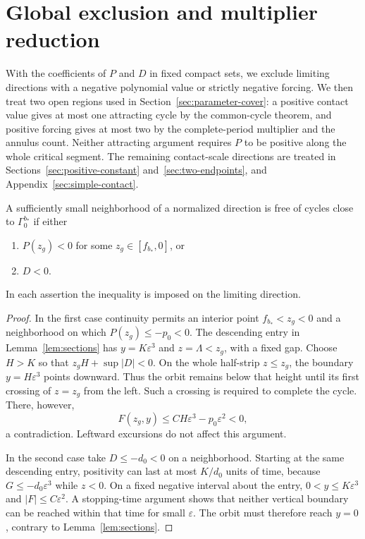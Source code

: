 \section{Global exclusion and multiplier reduction}\label{sec:whole-period}
With the coefficients of $P$ and $D$ in fixed compact sets, we exclude
limiting directions with a negative polynomial value or strictly negative
forcing. We then treat two open regions used in
Section~\ref{sec:parameter-cover}: a positive contact value gives at most
one attracting cycle by the common-cycle theorem, and positive forcing
gives at most two by the complete-period multiplier and the annulus
count. Neither attracting argument requires $P$ to be positive along
the whole critical segment. The remaining contact-scale directions are
treated in Sections~\ref{sec:positive-constant}
and~\ref{sec:two-endpoints}, and Appendix~\ref{sec:simple-contact}.

\begin{lemma}\label{lem:negative-gates}
A sufficiently small neighborhood of a normalized direction is free
of cycles close to $\Gamma_0^{b_*}$ if either
\begin{enumerate}
\item $P(z_g)<0$ for some $z_g\in[f_{b_*},0]$, or
\item $D<0$.
\end{enumerate}
In each assertion the inequality is imposed on the limiting direction.
\end{lemma}
\begin{proof}
In the first case continuity permits an interior point
$f_{b_*}<z_g<0$ and a neighborhood on which $P(z_g)\le-p_0<0$.
The descending entry in Lemma~\ref{lem:sections} has
$y=K\varepsilon^3$ and $z=\Lambda<z_g$, with a fixed gap.
Choose $H>K$ so that $z_gH+\sup|D|<0$. On the whole half-strip
$z\le z_g$, the boundary $y=H\varepsilon^3$ points downward.
Thus the orbit remains below that height until its first crossing
of $z=z_g$ from the left. Such a crossing is required to complete
the cycle. There, however,
\[
 F(z_g,y)\le CH\varepsilon^3-p_0\varepsilon^2<0,
\]
a contradiction. Leftward excursions do not affect this argument.

In the second case take $D\le-d_0<0$ on a neighborhood. Starting
at the same descending entry, positivity can last at most $K/d_0$
units of time, because $G\le-d_0\varepsilon^3$ while $z<0$.
On a fixed negative interval about the entry, $0<y\le K\varepsilon^3$
and $|F|\le C\varepsilon^2$. A stopping-time argument shows
that neither vertical boundary can be reached within that time for
small $\varepsilon$. The orbit must therefore reach $y=0$, contrary
to Lemma~\ref{lem:sections}.
\end{proof}

